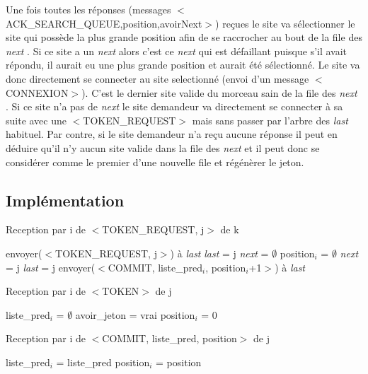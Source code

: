\documentclass[a4paper,12pt]{report}
\newcommand{\last}{\textit{last} }
\newcommand{\next}{\textit{next} }
\begin{document}
Une fois toutes les réponses (messages $<$ACK\_SEARCH\_QUEUE,position,avoirNext$>$) reçues le site va sélectionner le site qui possède la plus grande position afin de se raccrocher au bout de la file des \next.
Si ce site a un \next alors c'est ce \next qui est défaillant puisque s'il avait répondu, il aurait eu une plus grande position et aurait été sélectionné. Le site va donc directement se connecter au site selectionné (envoi d'un message $<$CONNEXION$>$). C'est le dernier site valide du morceau sain de la file des \next.
Si ce site n'a pas de \next le site demandeur va directement se connecter à sa suite avec une $<$TOKEN\_REQUEST$>$ mais sans passer par l'arbre des \last habituel.
Par contre, si le site demandeur n'a reçu aucune réponse il peut en déduire qu'il n'y aucun site valide dans la file des \next et il peut donc se considérer comme le premier d'une nouvelle file et régénèrer le jeton.


\subsection*{Implémentation}

\begin{algorithm}[t]
\caption{Reception par i de $<$TOKEN\_REQUEST, j$>$ de k}
\label{algo_naimi_trehel_amelioration_recpt_TK}
\begin{algorithmic}[1]

\IF {\last$_{i}$ $\ne$ i}
  \STATE envoyer($<$TOKEN\_REQUEST, j$>$) à \last 
  \STATE \last = j
  \STATE \next = $\emptyset$
  \STATE position$_{i}$ = $\emptyset$
\ELSE
\STATE \next = j
\STATE \last = j
\STATE envoyer($<$COMMIT, liste\_pred$_{i}$, position$_{i}$+1$>$) à \last
\ENDIF
\end{algorithmic}
\end{algorithm}

\begin{algorithm}[t]
\caption{Reception par i de $<$TOKEN$>$ de j}
\label{algo_naimi_trehel_amelioration_recpt_T}
\begin{algorithmic}[1]
\STATE liste\_pred$_{i}$ = $\emptyset$
\STATE avoir\_jeton = vrai
\STATE position$_{i}$ = 0
\end{algorithmic}
\end{algorithm}


\begin{algorithm}[t]
\caption{Reception par i de $<$COMMIT, liste\_pred, position$>$ de j}
\label{algo_naimi_trehel_amelioration_recpt_C}
\begin{algorithmic}[1]
\STATE liste\_pred$_{i}$ = liste\_pred
\STATE position$_{i}$ = position
\end{algorithmic}
\end{algorithm}
\end{document}
